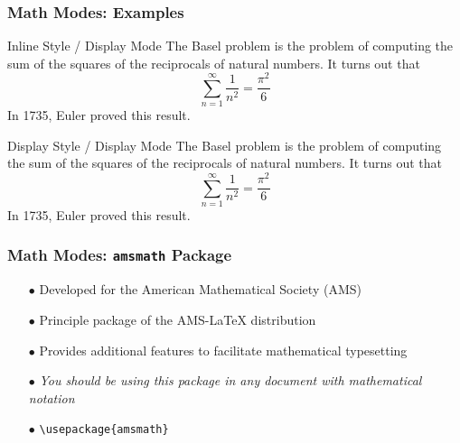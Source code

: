 \begin{frame}[fragile]
\frametitle{Math Modes: Examples}
\begin{exampleblock}{Inline Style / Display Mode}
    \small The Basel problem is the problem of computing the sum of the squares of the reciprocals of natural numbers. It turns out that \[ \textstyle \sum^\infty_{n=1} \frac{1}{n^2} = \frac{\pi^2}{6}\] In 1735, Euler proved this result.
\end{exampleblock}
\begin{exampleblock}{Display Style / Display Mode}
    \small The Basel problem is the problem of computing the sum of the squares of the reciprocals of natural numbers. It turns out that \[ \sum^\infty_{n=1} \frac{1}{n^2} = \frac{\pi^2}{6}\] In 1735, Euler proved this result.
\end{exampleblock}
\end{frame}


\begin{frame}[fragile]
\frametitle{Math Modes: \texttt{amsmath} Package}
\begin{itemize}
    \item[$\bullet$] Developed for the American Mathematical Society (AMS)
    \item[$\bullet$] Principle package of the AMS-\LaTeX{} distribution
    \item[$\bullet$] Provides additional features to facilitate mathematical typesetting
    \item[$\bullet$] \textit{You should be using this package in any document with mathematical notation} 
    \item[$\bullet$] \verb|\usepackage{amsmath}|
\end{itemize}
\end{frame}



